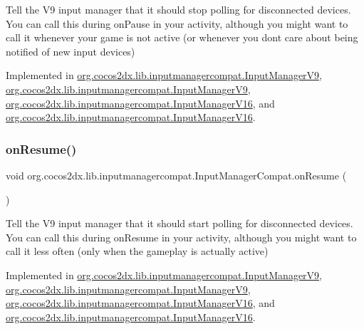 Tell the V9 input manager that it should stop polling for disconnected devices. You can call this during on\+Pause in your activity, although you might want to call it whenever your game is not active (or whenever you don\textquotesingle{}t care about being notified of new input devices) 

Implemented in \hyperlink{classorg_1_1cocos2dx_1_1lib_1_1inputmanagercompat_1_1InputManagerV9_ab80665476c8b79b16cbea8b2679effc6}{org.\+cocos2dx.\+lib.\+inputmanagercompat.\+Input\+Manager\+V9}, \hyperlink{classorg_1_1cocos2dx_1_1lib_1_1inputmanagercompat_1_1InputManagerV9_ab80665476c8b79b16cbea8b2679effc6}{org.\+cocos2dx.\+lib.\+inputmanagercompat.\+Input\+Manager\+V9}, \hyperlink{classorg_1_1cocos2dx_1_1lib_1_1inputmanagercompat_1_1InputManagerV16_a06c3db7d607a8a43c9d27565dd759340}{org.\+cocos2dx.\+lib.\+inputmanagercompat.\+Input\+Manager\+V16}, and \hyperlink{classorg_1_1cocos2dx_1_1lib_1_1inputmanagercompat_1_1InputManagerV16_a06c3db7d607a8a43c9d27565dd759340}{org.\+cocos2dx.\+lib.\+inputmanagercompat.\+Input\+Manager\+V16}.

\mbox{\label{interfaceorg_1_1cocos2dx_1_1lib_1_1inputmanagercompat_1_1InputManagerCompat_a8ce6170ffd23cf2a18374c271939ac1e}} 
\subsubsection{\texorpdfstring{on\+Resume()}{onResume()}\hspace{0.1cm}{\footnotesize\ttfamily [1/2]}}
{\footnotesize\ttfamily void org.\+cocos2dx.\+lib.\+inputmanagercompat.\+Input\+Manager\+Compat.\+on\+Resume (\begin{DoxyParamCaption}{ }\end{DoxyParamCaption})}

Tell the V9 input manager that it should start polling for disconnected devices. You can call this during on\+Resume in your activity, although you might want to call it less often (only when the gameplay is actually active) 

Implemented in \hyperlink{classorg_1_1cocos2dx_1_1lib_1_1inputmanagercompat_1_1InputManagerV9_a94c18cf8110be2479e6cb8d9528b57d5}{org.\+cocos2dx.\+lib.\+inputmanagercompat.\+Input\+Manager\+V9}, \hyperlink{classorg_1_1cocos2dx_1_1lib_1_1inputmanagercompat_1_1InputManagerV9_a94c18cf8110be2479e6cb8d9528b57d5}{org.\+cocos2dx.\+lib.\+inputmanagercompat.\+Input\+Manager\+V9}, \hyperlink{classorg_1_1cocos2dx_1_1lib_1_1inputmanagercompat_1_1InputManagerV16_a06cacfc2a899e281361bfd190d35bcec}{org.\+cocos2dx.\+lib.\+inputmanagercompat.\+Input\+Manager\+V16}, and \hyperlink{classorg_1_1cocos2dx_1_1lib_1_1inputmanagercompat_1_1InputManagerV16_a06cacfc2a899e281361bfd190d35bcec}{org.\+cocos2dx.\+lib.\+inputmanagercompat.\+Input\+Manager\+V16}.

